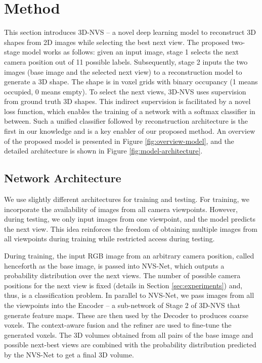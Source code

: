 \section{Method}
\label{sec:method}
This section introduces 3D-NVS -- a novel deep learning model to reconstruct 3D shapes from 2D images while selecting the best next view. The proposed two-stage model works as follows: given an input image, stage 1 selects the next camera position out of 11 possible labels. Subsequently, stage 2 inputs the two images (base image and the selected next view) to a reconstruction model to generate a 3D shape. The shape is in voxel grids with binary occupancy (1 means occupied, 0 means empty). To select the next views, 3D-NVS uses supervision from ground truth 3D shapes. This indirect supervision is facilitated by a novel loss function, which enables the training of a network with a softmax classifier in between. Such a unified classifier followed by reconstruction architecture is the first in our knowledge and is a key enabler of our proposed method. An overview of the proposed model is presented in Figure \ref{fig:overview-model}, and the detailed architecture is shown in Figure \ref{fig:model-architecture}.
\subsection{Network Architecture}
We use slightly different architectures for training and testing. For training, we incorporate the availability of images from all camera viewpoints. However, during testing, we only input images from one viewpoint, and the model predicts the next view. This idea reinforces the freedom of obtaining multiple images from all viewpoints during training while restricted access during testing. 

During training, the input RGB image from an arbitrary camera position, called henceforth as the base image, is passed into NVS-Net, which outputs a probability distribution over the next views. The number of possible camera positions for the next view is fixed (details in Section \ref{sec:experiments}) and, thus, is a classification problem. In parallel to NVS-Net, we pass images from all the viewpoints into the Encoder -- a sub-network of Stage 2 of 3D-NVS that generate feature maps. These are then used by the Decoder to produces coarse voxels. The context-aware fusion and the refiner \cite{pix2vox} are used to fine-tune the generated voxels. The 3D volumes obtained from all pairs of the base image and possible next-best views are combined with the probability distribution predicted by the NVS-Net to get a final 3D volume.

